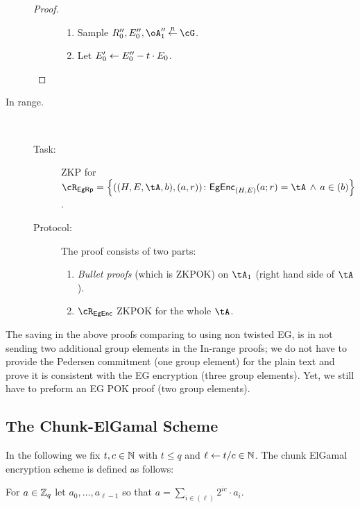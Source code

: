 \begin{description}
\begin{proof}
\begin{description}
\begin{enumerate}
			\item Sample $R_0'',E_0'',\oA_1'' \getsr  \cG$.
			
			
			\item Let $E_0' \leftarrow E_0'' - t \cdot E_0$.
			
			
		\end{enumerate}		
	\end{description}
	\end{proof}
	\item[In range.] ~
	\begin{description}
		\item[Task:] ZKP for $\rEgRp =\rEgRpDef$.
		
		\item[Protocol:]  The proof consists of two parts:
		\begin{enumerate}
			\item  \textit{Bullet proofs} \cite{SP:BBBPWM18}  (which is  ZKPOK) on $\tA_1$ (\ie right hand side of $\tA$).   
			
			
			
			\item   $\rEgEnc$ ZKPOK  for the whole $\tA$.
		\end{enumerate}
		
	\end{description}
\end{description}

\begin{remark}[Efficiency]
	The saving in the above proofs comparing to using non twisted EG, is in not sending two additional   group elements in the In-range proofs;  we do not have to provide the Pedersen commitment (one group element)  for the plain text and prove it is consistent with the EG encryption (three group elements). Yet, we still have to preform an EG POK proof (two group elements).
\end{remark}	

	
\subsection{The Chunk-ElGamal  Scheme}\label{sec:ChanksEg:EgScheme}
In the following we fix $t,c\in {\mathbb{N}}$ with $t\le q$ and $\ell \leftarrow t/c \in {\mathbb{N}}$. The chunk ElGamal encryption scheme  is defined as follows:



\begin{definition}\label{def:basefactor}
For $a\in {\mathbb Z}_q$ let $a_0,\ldots,a_{\ell-1}$ so that $a =  \sum_{i \in (\ell)}    2^{i c} \cdot a_i$.
\end{definition}


